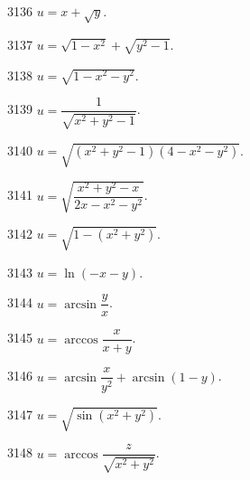 


\begin{prob}[S]{3136}
$u = x + \sqrt{y}$.
\end{prob}

\begin{prob}[S]{3137}
$u = \sqrt{1 - x^2} + \sqrt{y^2 - 1}$.
\end{prob}

\begin{prob}[S]{3138}
$u = \sqrt{1 - x^2 - y^2}$.
\end{prob}

\begin{prob}[S]{3139}
$u = \dfrac{1}{\sqrt{x^2 + y^2 - 1}}$.
\end{prob}

\begin{prob}[S]{3140}
$u = \sqrt{(x^2 + y^2 - 1)(4 - x^2 - y^2)}$.
\end{prob}

\begin{prob}[S]{3141}
$u = \sqrt{\dfrac{x^2 + y^2 - x}{2x - x^2 - y^2}}$.
\end{prob}

\begin{prob}[S]{3142}
$u = \sqrt{1 - (x^2 + y^2)}$.
\end{prob}

\begin{prob}[S]{3143}
$u = \ln(-x - y)$.
\end{prob}

\begin{prob}[S]{3144}
$u = \arcsin \dfrac{y}{x}$.
\end{prob}

\begin{prob}[S]{3145}
$u = \arccos \dfrac{x}{x + y}$.
\end{prob}

\begin{prob}[S]{3146}
$u = \arcsin \dfrac{x}{y^2} + \arcsin(1 - y)$.
\end{prob}

\begin{prob}[S]{3147}
$u = \sqrt{\sin(x^2 + y^2)}$.
\end{prob}

\begin{prob}[S]{3148}
$u = \arccos \dfrac{z}{\sqrt{x^2 + y^2}}$.
\end{prob}

